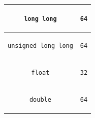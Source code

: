 \begin{table}
\begin{center}
{\begin{tabular}{|c|c|}
\begin{lstlisting}
long long
\end{lstlisting}  &
\begin{lstlisting}
64
\end{lstlisting} \\ \hline 

\begin{lstlisting}
unsigned long long
\end{lstlisting}  &
\begin{lstlisting}
64
\end{lstlisting} \\ \hline 
\begin{lstlisting}
float
\end{lstlisting}  &
\begin{lstlisting}
32
\end{lstlisting} \\ \hline 
\begin{lstlisting}
double
\end{lstlisting}  &
\begin{lstlisting}
64
\end{lstlisting} \\ \hline 
\end{tabular}
}
\label{Table:Primitive:Types} 
\end{center}
\end{table}

